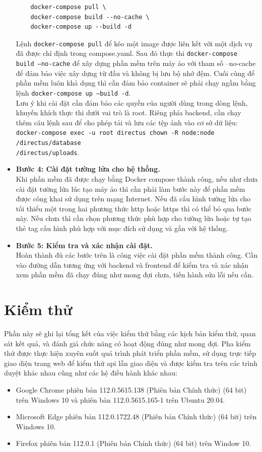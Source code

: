 \documentclass[./../main.tex]{subfiles}
\begin{document}
\begin{itemize}
\begin{verbatim}
    docker-compose pull \
    docker-compose build --no-cache \
    docker-compose up --build -d
    \end{verbatim}
    Lệnh \texttt{docker-compose pull} để kéo một image được liên kết với một dịch vụ đã được chỉ định trong compose.yaml. Sau đó thực thi \texttt{docker-compose build --no-cache} để xây dựng phần mềm trên máy ảo với tham số --no-cache để đảm bảo việc xây dựng từ đầu và không bị lưu bộ nhớ đệm. Cuối cùng để phần mềm luôn khả dụng thì cần đảm bảo container sẽ phải chạy ngầm bằng lệnh \texttt{docker-compose up --build -d}.\\
    Lưu ý khi cài đặt cần đảm bảo các quyền của người dùng trong dòng lệnh, khuyến khích thực thi dưới vai trò là root. Riêng phía backend, cần chạy thêm câu lệnh sau để cho phép tải và lưu các tệp ảnh vào cơ sở dữ liệu: \texttt{docker-compose exec -u root directus chown -R node:node /directus/database \\ /directus/uploads}.
    \item \textbf{Bước 4: Cài đặt tường lửa cho hệ thống.}\\
    Khi phần mềm đã được chạy bằng Docker compose thành công, nếu như chưa cài đặt tường lửa lúc tạo máy ảo thì cần phải làm bước này để phần mềm được công khai sử dụng trên mạng Internet. Nếu đã cấu hình tường lửa cho tối thiểu một trong hai phương thức \acrshort{http} hoặc \acrshort{https} thì có thể bỏ qua bước này. Nếu chưa thì cần chọn phương thức phù hợp cho tường lửa hoặc tự tạo thẻ tag cấu hình phù hợp với mục đích sử dụng và gắn với hệ thống.
    \item \textbf{Bước 5: Kiểm tra và xác nhận cài đặt.}\\
    Hoàn thành đủ các bước trên là công việc cài đặt phần mềm thành công. Cần vào đường dẫn tương ứng với backend và frontend để kiểm tra và xác nhận xem phần mềm đã chạy đúng như mong đợi chưa, tiến hành sửa lỗi nếu cần.
\end{itemize}

\section{Kiểm thử}
Phần này sẽ ghi lại tổng kết của việc kiểm thử bằng các kịch bản kiểm thử, quan sát kết quả, và đánh giá chức năng có hoạt động đúng như mong đợi. Pha kiểm thử được thực hiện xuyên suốt quá trình phát triển phần mềm, sử dụng trực tiếp giao diện trang web để kiểm thử \acrshort{api} lẫn giao diện và được kiểm tra trên các trình duyệt khác nhau cũng như các hệ điều hành khác nhau:
\begin{itemize}
    \item Google Chrome phiên bản 112.0.5615.138 (Phiên bản Chính thức) (64 bit) trên Windows 10 và phiên bản 112.0.5615.165-1 trên Ubuntu 20.04.
    \item Microsoft Edge phiên bản 112.0.1722.48 (Phiên bản Chính thức) (64 bit) trên Windows 10. 
    \item Firefox phiên bản 112.0.1 (Phiên bản Chính thức) (64 bit) trên Window 10.  
\end{itemize}
\end{document}
